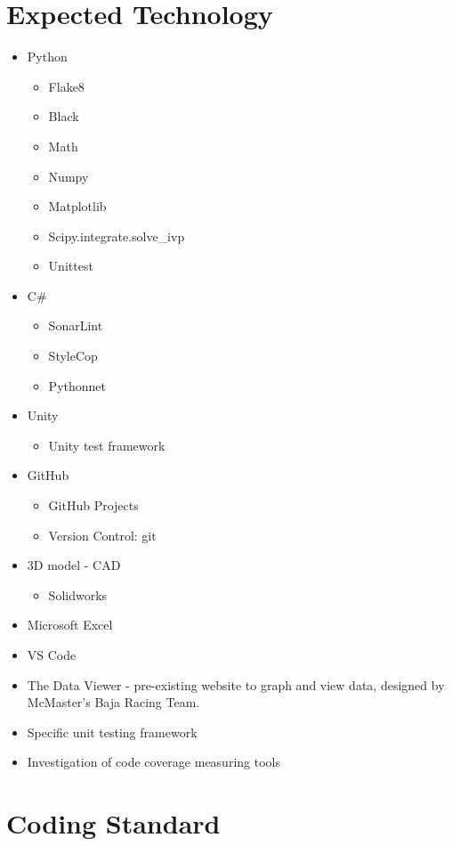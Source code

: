 \documentclass{article}
\begin{document}
\section{Expected Technology}

\begin{itemize}
\item Python
\begin{itemize}
  \item Flake8
  \item Black
  \item Math
  \item Numpy
  \item Matplotlib
  \item Scipy.integrate.solve\_ivp
  \item Unittest
\end{itemize}
\item C\#
\begin{itemize}
  \item SonarLint
  \item StyleCop
  \item Pythonnet
\end{itemize}
\item Unity
\begin{itemize}
  \item Unity test framework
\end{itemize}
\item GitHub
\begin{itemize}
  \item GitHub Projects
  \item Version Control: git
\end{itemize}
\item 3D model - CAD
\begin{itemize}
  \item Solidworks
\end{itemize}
\item Microsoft Excel
\item VS Code
\item The Data Viewer - pre-existing website to graph and view data, designed by McMaster's Baja Racing Team.
\item Specific unit testing framework
\item Investigation of code coverage measuring tools
\end{itemize}

\section{Coding Standard}
\end{document}

